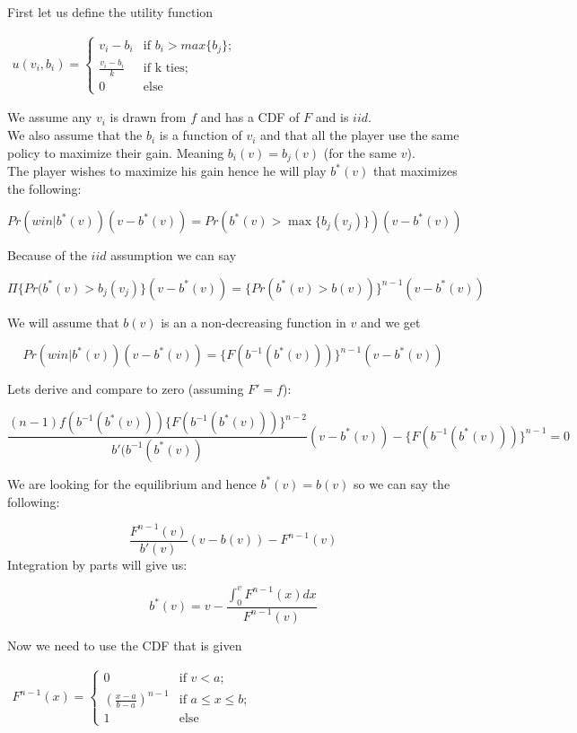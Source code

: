 \documentclass{article}
\begin{document}
First let us define the utility function

$\begin{matrix} u(v_i,b_i) = \left\{ \begin{array}{ll}
         v_i-b_i & \mbox{if $b_i>max\{b_j\}$};\\
         \frac{v_i-b_i}{k} & \mbox{if k ties};\\
        0 & \mbox{else}\end{array} \right.
        
 \end{matrix}  $

We assume any $v_i$ is drawn from $f$ and has a CDF of $F$ and is $iid$.
\\
We also assume that the $b_i$ is a function of $v_i$ and that all the player use
the same policy to maximize their gain. Meaning $b_i(v) = b_j(v)$ (for the
same $v$).\\

The player wishes to maximize his gain hence he will play $b^*(v)$ that
maximizes the following:

$$Pr(win|b^*(v))(v-b^*(v)) = Pr(b^*(v)>\max\{b_j(v_j)\})(v-b^*(v))$$

Because of the $iid$ assumption we can say

$$\Pi\{Pr(b^*(v)>b_j(v_j)\}(v-b^*(v))=\{Pr(b^*(v)>b(v))\}^{n-1}(v-b^*(v))$$

We will assume that $b(v)$ is an a non-decreasing function in $v$ and we get  

$$Pr(win|b^*(v))(v-b^*(v)) = \{F(b^{-1}(b^*(v)))\}^{n-1}(v-b^*(v))$$

Lets  derive and compare to zero (assuming $F'=f$):

$$\frac{(n-1)f(b^{-1}(b^*(v)))\{F(b^{-1}(b^*(v)))\}^{n-2}}{b'(b^{-1}(b^*(v))}(v-b^*(v))
- \{F(b^{-1}(b^*(v)))\}^{n-1} = 0$$

We are looking for the equilibrium and hence $b^*(v)=b(v)$ so we can say the
following: 

$$\frac{F^{n-1}(v)}{b'(v)}(v-b(v))-F^{n-1}(v) $$
Integration by parts will give us:

$$b^*(v) = v-\frac{\int_0^v F^{n-1}(x)dx}{F^{n-1}(v)}$$

Now we need to use the CDF that is given 



$\begin{matrix} F^{n-1}(x) = \left\{ \begin{array}{ll}
         0 & \mbox{if $v<a$};\\
         (\frac{x-a}{b-a})^{n-1} & \mbox{if $a\leq x \leq b$};\\
        1 & \mbox{else}\end{array} \right.
        
 \end{matrix}  $
\end{document}
